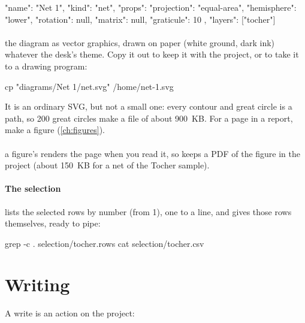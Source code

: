 \begin{codeblock}
{
  "name": "Net 1",
  "kind": "net",
  "props": { "projection": "equal-area",
             "hemisphere": "lower",
             "rotation": null, "matrix": null,
             "graticule": 10 },
  "layers": ["tocher"]
}
\end{codeblock}

\paragraph{} the diagram as vector graphics, drawn on paper (white ground, dark ink)
whatever the desk's theme. Copy it out to keep it with the project, or to take it to a drawing program:

\begin{codeblock}
cp "diagrams/Net 1/net.svg" /home/net-1.svg
\end{codeblock}

It is an ordinary SVG, but not a small one: every contour and great circle is a path, so 200 great
circles make a file of about 900~KB. For a page in a report, make a figure (\cref{ch:figures}).

\paragraph{} a figure's  renders the page when you read it, so
 keeps a PDF of the figure in the project (about 150~KB for a
net of the Tocher sample).

\paragraph{The selection}  lists the selected rows by number (from 1), one to
a line, and  gives those rows themselves, ready to pipe:

\begin{codeblock}
grep -c . selection/tocher.rows
cat selection/tocher.csv
\end{codeblock}

\section{Writing}\label{sec:project-write}

A write is an action on the project:

